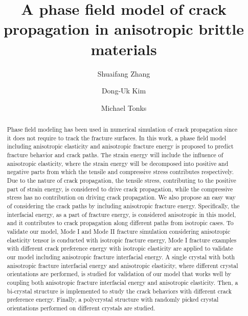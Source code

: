 \documentclass[3p,10pt,sort&compress]{elsarticle}
\begin{document}
\begin{frontmatter}

\title{A phase field model of crack propagation in anisotropic brittle materials}

\author[uf,psu]{Shuaifang Zhang}

\author[uf]{Dong-Uk Kim}


\author[uf,psu]{Michael Tonks}


\address[uf]{University of Florida, Gainesville, FL}
\address[psu]{The Pennsylvania State University, State College, PA}
\address[inl]{Idaho National Laboratory, Idaho Falls, ID}

\begin{abstract}

Phase field modeling has been used in numerical simulation of crack propagation since it does not require to track the fracture surfaces. In this work, a phase field model including anisotropic elasticity and anisotropic fracture energy is proposed to predict fracture behavior and crack paths. The strain energy will include the influence of anisotropic elasticity, where the strain energy will be decomposed into positive and negative parts from which the tensile and compressive stress contributes respectively. Due to the nature of crack propagation, the tensile stress, contributing to the positive part of strain energy, is considered to drive crack propagation, while the compressive stress has no contribution on driving crack propagation. We also propose an easy way of considering the crack paths by including anisotropic fracture energy. Specifically, the interfacial energy, as a part of fracture energy, is considered anisotropic in this model, and it contributes to crack propagation along different paths from isotropic cases. To validate our model, Mode I and Mode II fracture simulation considering anisotropic elasticity tensor is conducted with isotropic fracture energy, Mode I fracture examples with different crack preference energy with isotropic elasticity are applied to validate our model including anisotropic fracture interfacial energy. A single crystal with both anisotropic fracture interfacial energy and anisotropic elasticity, where different crystal orientations are performed, is studied for validation of our model that works well by coupling both anisotropic fracture interfacial energy and anisotropic elasticity. Then, a bi-crystal structure is implemented to study the crack behaviors with different crack preference energy. Finally, a polycrystal structure with randomly picked crystal orientations performed on different crystals are studied.


\end{abstract}
\end{frontmatter}
\end{document}
